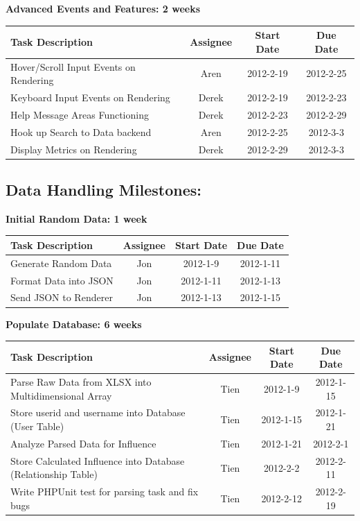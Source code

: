 \documentclass[12pt, letterpaper]{article}
\begin{document}
  \begin{center}
		{\bf Advanced Events and Features: 2 weeks}
    \begin{tabular}{| p{8.3cm} || c | c | c | }
      \hline
      Task Description & Assignee & Start Date & Due Date \\
      \hline
	    Hover/Scroll Input Events on Rendering & Aren & 2012-2-19 & 2012-2-25 \\
	    Keyboard Input Events on Rendering & Derek & 2012-2-19 & 2012-2-23 \\
	    Help Message Areas Functioning & Derek & 2012-2-23 & 2012-2-29 \\
	    Hook up Search to Data backend & Aren & 2012-2-25 & 2012-3-3 \\
	    Display Metrics on Rendering & Derek & 2012-2-29 & 2012-3-3 \\
      \hline
    \end{tabular}
  \end{center}

  	\subsection{Data Handling Milestones:}

  \begin{center}
		{\bf Initial Random Data: 1 week}
    \begin{tabular}{| p{8.3cm} || c | c | c | }
      \hline
      Task Description & Assignee & Start Date & Due Date \\
      \hline
	    Generate Random Data & Jon & 2012-1-9 & 2012-1-11 \\
	    Format Data into JSON & Jon & 2012-1-11 & 2012-1-13 \\
	    Send JSON to Renderer & Jon & 2012-1-13 & 2012-1-15 \\
      \hline
    \end{tabular}
  \end{center}

  \begin{center}
		{\bf Populate Database: 6 weeks}
    \begin{tabular}{| p{8.3cm} || c | c | c | }
      \hline
      Task Description & Assignee & Start Date & Due Date \\
      \hline
	    Parse Raw Data from XLSX into Multidimensional Array & Tien & 2012-1-9 & 2012-1-15 \\
        Store userid and username into Database (User Table) & Tien & 2012-1-15 & 2012-1-21 \\
	    Analyze Parsed Data for Influence & Tien & 2012-1-21 & 2012-2-1 \\
        Store Calculated Influence into Database (Relationship Table) & Tien & 2012-2-2 & 2012-2-11 \\
		Write PHPUnit test for parsing task and fix bugs & Tien & 2012-2-12 & 2012-2-19 \\
      \hline
    \end{tabular}
  \end{center}
\end{document}

